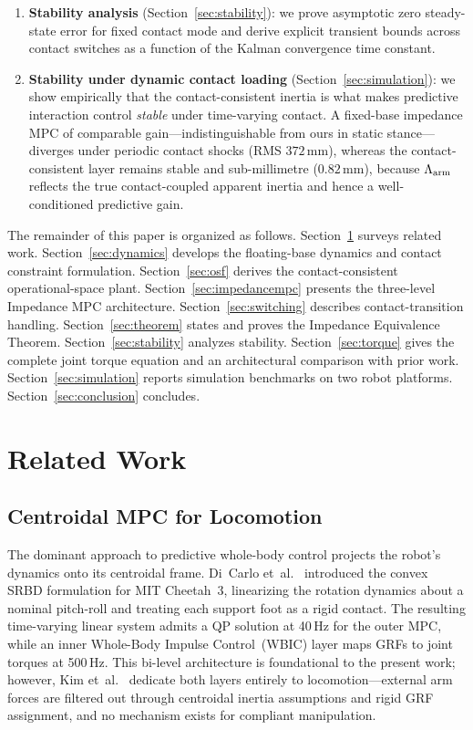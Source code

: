 \begin{enumerate}
\item \textbf{Stability analysis} (Section~\ref{sec:stability}): we prove
asymptotic zero steady-state error for fixed contact mode and derive
explicit transient bounds across contact switches as a function of the
Kalman convergence time constant.

\item \textbf{Stability under dynamic contact loading}
(Section~\ref{sec:simulation}): we show empirically that the
contact-consistent inertia is what makes predictive interaction control
\emph{stable} under time-varying contact. A fixed-base impedance MPC of
comparable gain---indistinguishable from ours in static stance---diverges
under periodic contact shocks (RMS $372$\,mm), whereas the contact-consistent
layer remains stable and sub-millimetre ($0.82$\,mm), because $\Lambda_{\text{arm}}$ reflects
the true contact-coupled apparent inertia and hence a well-conditioned
predictive gain.
\end{enumerate}

The remainder of this paper is organized as follows.
Section~\ref{sec:related} surveys related work.
Section~\ref{sec:dynamics} develops the floating-base dynamics and contact
constraint formulation.
Section~\ref{sec:osf} derives the contact-consistent operational-space
plant.
Section~\ref{sec:impedancempc} presents the three-level Impedance MPC
architecture.
Section~\ref{sec:switching} describes contact-transition handling.
Section~\ref{sec:theorem} states and proves the Impedance Equivalence
Theorem.
Section~\ref{sec:stability} analyzes stability.
Section~\ref{sec:torque} gives the complete joint torque equation and an
architectural comparison with prior work.
Section~\ref{sec:simulation} reports simulation benchmarks on two robot
platforms.
Section~\ref{sec:conclusion} concludes.

\section{Related Work}\label{sec:related}

\subsection{Centroidal MPC for Locomotion}

The dominant approach to predictive whole-body control projects the robot's
dynamics onto its centroidal frame.
Di~Carlo et~al.~\cite{dicarlo2018dynamic} introduced the convex SRBD
formulation for MIT Cheetah~3, linearizing the rotation dynamics about a
nominal pitch-roll and treating each support foot as a rigid contact.
The resulting time-varying linear system admits a QP solution at 40\,Hz for
the outer MPC, while an inner Whole-Body Impulse Control~(WBIC) layer maps
GRFs to joint torques at 500\,Hz.
This bi-level architecture is foundational to the present work; however,
Kim et~al.~\cite{kim2019highly} dedicate both layers entirely to
locomotion---external arm forces are filtered out through centroidal inertia
assumptions and rigid GRF assignment, and no mechanism exists for compliant
manipulation.

